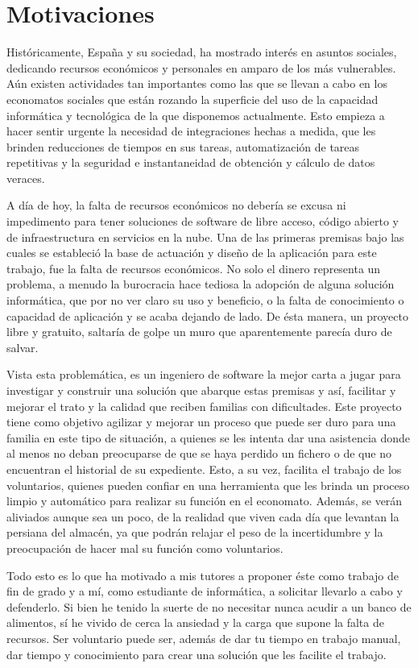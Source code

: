 \section{Motivaciones}
Históricamente, España y su sociedad, ha mostrado interés en asuntos sociales, dedicando recursos económicos y personales en amparo de los más vulnerables. Aún existen actividades tan importantes como las que se llevan a cabo en los economatos sociales que están rozando la superficie del uso de la capacidad informática y tecnológica de la que disponemos actualmente. Esto empieza a hacer sentir urgente la necesidad de integraciones hechas a medida, que les brinden reducciones de tiempos en sus tareas, automatización de tareas repetitivas y la seguridad e instantaneidad de obtención y cálculo de datos veraces.
\par A día de hoy, la falta de recursos económicos no debería se excusa ni impedimento para tener soluciones de software de libre acceso, código abierto y de infraestructura en servicios en la nube. Una de las primeras premisas bajo las cuales se estableció la base de actuación y diseño de la aplicación para este trabajo, fue la falta de recursos económicos. No solo el dinero representa un problema, a menudo la burocracia hace tediosa la adopción de alguna solución informática, que por no ver claro su uso y beneficio, o la falta de conocimiento o capacidad de
aplicación y se acaba dejando de lado. De ésta manera, un proyecto libre y gratuito, saltaría de golpe un muro que aparentemente parecía duro de salvar.
\par Vista esta problemática, es un ingeniero de software la mejor carta a jugar para investigar y construir una solución que abarque estas premisas y así, facilitar y mejorar el trato y la calidad que reciben familias con
dificultades. Este proyecto tiene como objetivo agilizar y mejorar un proceso que puede ser duro para una familia en este tipo de situación, a quienes se les intenta dar una asistencia donde al menos no deban
preocuparse de que se haya perdido un fichero o de que no encuentran el historial de su expediente.
Esto, a su vez, facilita el trabajo de los voluntarios, quienes pueden confiar en una herramienta que les brinda un proceso limpio y automático para realizar su función en el economato. Además, se verán aliviados aunque sea un poco, de la realidad que viven cada día que levantan la persiana del almacén, ya que podrán relajar el peso de la incertidumbre y la preocupación de hacer mal
su función como voluntarios.
\par Todo esto es lo que ha motivado a mis tutores a proponer éste como trabajo de fin de grado y a mí, como estudiante de informática, a solicitar llevarlo a cabo y defenderlo. Si bien he tenido la suerte de no necesitar nunca acudir a un banco de alimentos, sí he vivido de cerca la ansiedad y la carga que supone la falta de recursos. Ser voluntario puede ser, además de dar tu tiempo en trabajo manual, dar tiempo y conocimiento para crear una solución que les facilite el trabajo.

